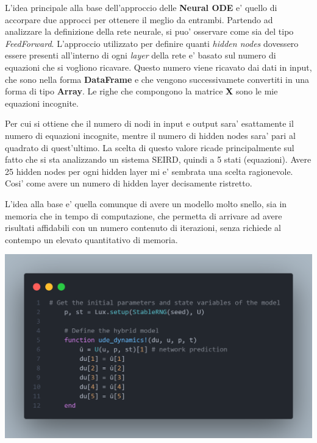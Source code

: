 L'idea principale alla base dell'approccio delle \textbf{Neural ODE} e' quello di accorpare
due approcci per ottenere il meglio da entrambi. Partendo ad analizzare la definizione della 
rete neurale, si puo' osservare come sia del tipo \emph{FeedForward}. L'approccio utilizzato per 
definire quanti \emph{hidden nodes} dovessero essere presenti all'interno di ogni \emph{layer} 
della rete e' basato sul numero di equazioni che si vogliono ricavare. Questo numero viene ricavato 
dai dati in input, che sono nella forma \textbf{DataFrame} e che vengono successivamete convertiti 
in una forma di tipo \textbf{Array}. Le righe che compongono la matrice \textbf{X} sono le mie equazioni
incognite.

Per cui si ottiene che il numero di nodi in input e output sara' esattamente il numero 
di equazioni incognite, mentre il numero di hidden nodes sara' pari al quadrato di quest'ultimo.
La scelta di questo valore ricade principalmente sul fatto che si sta analizzando un sistema SEIRD, 
quindi a 5 stati (equazioni). Avere 25 hidden nodes per ogni hidden layer mi e' sembrata una scelta 
ragionevole. Cosi' come avere un numero di hidden layer decisamente ristretto. 

L'idea alla base e' quella comunque di avere un modello molto snello, sia in memoria che in 
tempo di computazione, che permetta di arrivare ad avere risultati affidabili con un numero 
contenuto di iterazioni, senza richiede al contempo un elevato quantitativo di memoria.

\begin{minipage}{\linewidth}
	\centering
	\includegraphics[width=\textwidth]{img/hibrid_model.png}
	\label{fig:hibrid_model}
\end{minipage}

